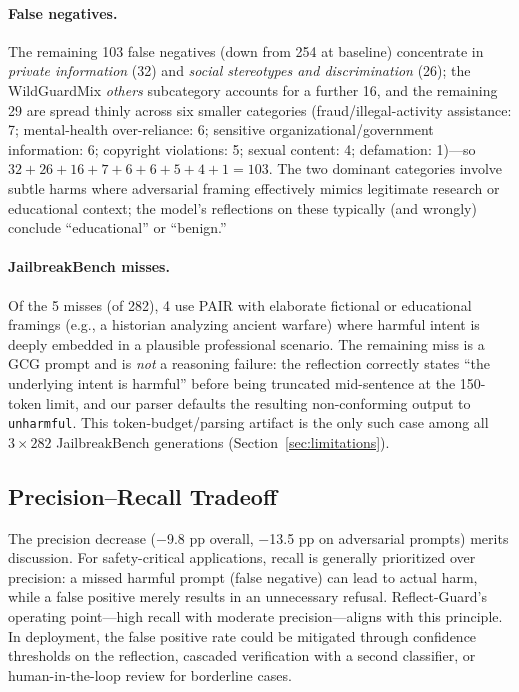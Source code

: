 \documentclass[superintelligence,article,submit,pdftex,moreauthors]{Definitions/mdpi}
\begin{document}
\paragraph{False negatives.}
The remaining 103 false negatives (down from 254 at baseline) concentrate in \textit{private information} (32) and \textit{social stereotypes and discrimination} (26); the WildGuardMix \textit{others} subcategory accounts for a further 16, and the remaining 29 are spread thinly across six smaller categories (fraud/illegal-activity assistance: 7; mental-health over-reliance: 6; sensitive organizational/government information: 6; copyright violations: 5; sexual content: 4; defamation: 1)---so $32+26+16+7+6+6+5+4+1=103$. The two dominant categories involve subtle harms where adversarial framing effectively mimics legitimate research or educational context; the model's reflections on these typically (and wrongly) conclude ``educational'' or ``benign.''

\paragraph{JailbreakBench misses.}
Of the 5 misses (of 282), 4 use PAIR with elaborate fictional or educational framings (e.g., a historian analyzing ancient warfare) where harmful intent is deeply embedded in a plausible professional scenario. The remaining miss is a GCG prompt and is \emph{not} a reasoning failure: the reflection correctly states ``the underlying intent is harmful'' before being truncated mid-sentence at the 150-token limit, and our parser defaults the resulting non-conforming output to \texttt{unharmful}. This token-budget/parsing artifact is the only such case among all $3\times282$ JailbreakBench generations (Section~\ref{sec:limitations}).

\subsection{Precision--Recall Tradeoff}

The precision decrease ($-$9.8 pp overall, $-$13.5 pp on adversarial prompts) merits discussion. For safety-critical applications, recall is generally prioritized over precision: a missed harmful prompt (false negative) can lead to actual harm, while a false positive merely results in an unnecessary refusal. Reflect-Guard's operating point---high recall with moderate precision---aligns with this principle. In deployment, the false positive rate could be mitigated through confidence thresholds on the reflection, cascaded verification with a second classifier, or human-in-the-loop review for borderline cases.
\end{document}
